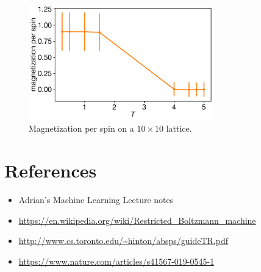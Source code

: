 \documentclass[12pt, two sided]{article}
\begin{document}
\begin{figure}[h!]
\includegraphics[width=8cm]{Figures/rbm_m.pdf}
\caption{Magnetization per spin on a $10\times10$ lattice.}
\end{figure} 



\section{References}

\begin{itemize}
\item Adrian's Machine Learning Lecture notes \\
\item \url{https://en.wikipedia.org/wiki/Restricted_Boltzmann_machine} \\
\item \url{http://www.cs.toronto.edu/~hinton/absps/guideTR.pdf} \\
\item \url{https://www.nature.com/articles/s41567-019-0545-1}
\end{itemize}

{} 
 \singlespacing


\doublespacing
\end{document}
